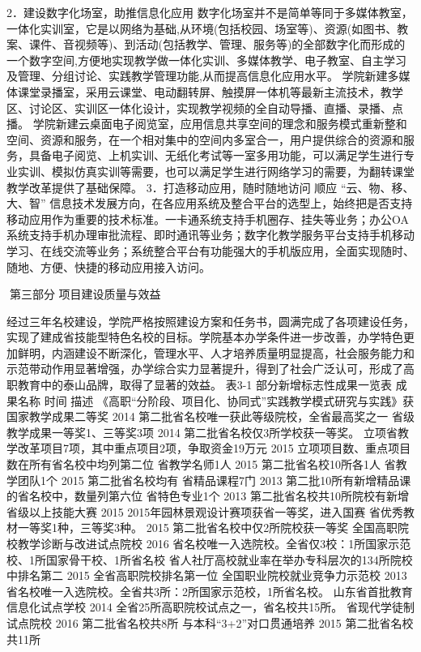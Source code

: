 2．建设数字化场室，助推信息化应用
数字化场室并不是简单等同于多媒体教室，一体化实训室，它是以网络为基础,从环境(包括校园、场室等)、资源(如图书、教案、课件、音视频等)、到活动(包括教学、管理、服务等)的全部数字化而形成的一个数字空间,方便地实现教学做一体化实训、多媒体教学、电子教室、自主学习及管理、分组讨论、实践教学管理功能,从而提高信息化应用水平。
学院新建多媒体课堂录播室，采用云课堂、电动翻转屏、触摸屏一体机等最新主流技术，教学区、讨论区、实训区一体化设计，实现教学视频的全自动导播、直播、录播、点播。
学院新建云桌面电子阅览室，应用信息共享空间的理念和服务模式重新整和空间、资源和服务，在一个相对集中的空间内多室合一，用户提供综合的资源和服务，具备电子阅览、上机实训、无纸化考试等一室多用功能，可以满足学生进行专业实训、模拟仿真实训等需要，也可以满足学生进行网络学习的需要，为翻转课堂教学改革提供了基础保障。
3．打造移动应用，随时随地访问
顺应 “云、物、移、大、智” 信息技术发展方向，在各应用系统及整合平台的选型上，始终把是否支持移动应用作为重要的技术标准。一卡通系统支持手机圈存、挂失等业务；办公OA系统支持手机办理审批流程、即时通讯等业务；数字化教学服务平台支持手机移动学习、在线交流等业务；系统整合平台有功能强大的手机版应用，全面实现随时、随地、方便、快捷的移动应用接入访问。



第三部分   项目建设质量与效益

经过三年名校建设，学院严格按照建设方案和任务书，圆满完成了各项建设任务，实现了建成省技能型特色名校的目标。学院基本办学条件进一步改善，办学特色更加鲜明，内涵建设不断深化，管理水平、人才培养质量明显提高，社会服务能力和示范带动作用显著增强，办学综合实力显著提升，得到了社会广泛认可，形成了高职教育中的泰山品牌，取得了显著的效益。
表3-1  部分新增标志性成果一览表
成果名称
时间
描述
《高职“分阶段、项目化、协同式”实践教学模式研究与实践》获国家教学成果二等奖
2014
第二批省名校唯一获此等级院校，全省最高奖之一
省级教学成果一等奖1、三等奖3项
2014
第二批省名校仅3所学校获一等奖。
立项省教学改革项目7项，其中重点项目2项，争取资金19万元
2015
立项项目数、重点项目数在所有省名校中均列第二位
省教学名师1人
2015
第二批省名校10所各1人
省教学团队1个
2015
第二批省名校均有
省精品课程7门
2013
第二批10所有新增精品课的省名校中，数量列第六位
省特色专业1个
2013
第二批省名校共10所院校有新增
省级以上技能大赛
2015
2015年园林景观设计赛项获省一等奖，进入国赛
省优秀教材一等奖1种，三等奖3种。
2015
第二批省名校中仅2所院校获一等奖
全国高职院校教学诊断与改进试点院校
2016
省名校唯一入选院校。全省仅3校：1所国家示范校、1所国家骨干校、1所省名校
省人社厅高校就业率在举办专科层次的134所院校中排名第二
2015
全省高职院校排名第一位
全国职业院校就业竞争力示范校
2013
省名校唯一入选院校。全省共3所：2所国家示范校，1所省名校。
山东省首批教育信息化试点学校
2014
全省25所高职院校试点之一，省名校共15所。
省现代学徒制试点院校
2016
第二批省名校共8所
与本科“3+2”对口贯通培养
2015
第二批省名校共11所

